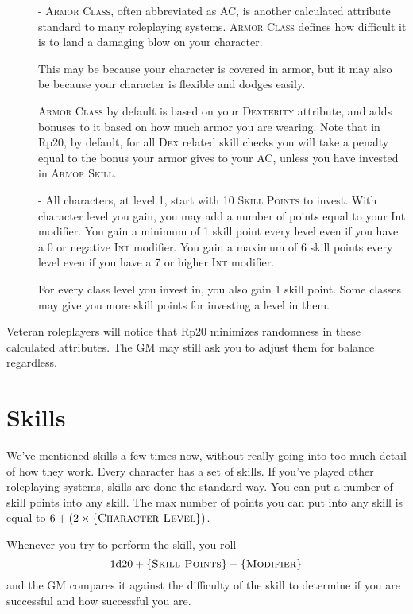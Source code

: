 \begin{description}
	\item[] - \textsc{Armor Class}, often abbreviated as AC, is another calculated attribute standard to many roleplaying systems. \textsc{Armor Class} defines how difficult it is to land a damaging blow on your character.
	
	This may be because your character is covered in armor, but it may also be because your character is flexible and dodges easily.
	
	\textsc{Armor Class} by default is based on your \textsc{Dexterity} attribute, and adds bonuses to it based on how much armor you are wearing. Note that in Rp20, by default, for all \textsc{Dex} related skill checks you will take a penalty equal to the bonus your armor gives to your AC, unless you have invested in \textsc{Armor Skill}.
	
	\item[] - All characters, at level 1, start with 10 \textsc{Skill Points} to invest. With character level you gain, you may add a number of points equal to your Int modifier. You gain a minimum of 1 skill point every level even if you have a 0 or negative \textsc{Int} modifier. You gain a maximum of 6 skill points every level even if you have a 7 or higher \textsc{Int} modifier.
	
	For every class level you invest in, you also gain 1 skill point. Some classes may give you more skill points for investing a level in them.
\end{description}

Veteran roleplayers will notice that Rp20 minimizes randomness in these calculated attributes. The GM may still ask you to adjust them for balance regardless.

\section{Skills}
We've mentioned skills a few times now, without really going into too much detail of how they work. Every character has a set of skills. If you’ve played other roleplaying systems, skills are done the standard way. You can put a number of skill points into any skill. The max number of points you can put into any skill is equal to $6+(2\times \{ \textsc{Character Level} \})$.

Whenever you try to perform the skill, you roll $$1\mathrm{d}20 + \{ \textsc{Skill Points} \} + \{ \textsc{Modifier} \}$$ and the GM compares it against the difficulty of the skill to determine if you are successful and how successful you are.

